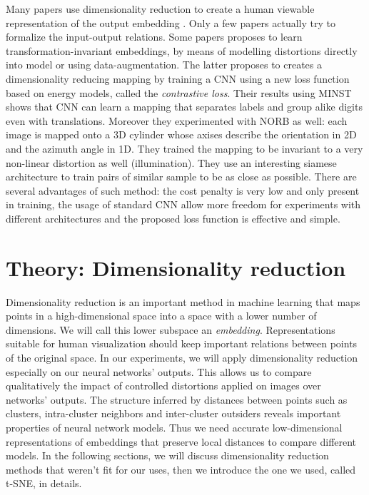 \documentclass[a4paper,12pt]{report}
\begin{document}
Many papers use dimensionality reduction to create a human viewable representation of the output embedding \cite{donahue2013decaf}\cite{yu2014visualizing}\cite{yaotiny}.
Only a few papers actually try to formalize the input-output relations\cite{goodfellow2009measuring}.
Some papers proposes to learn transformation-invariant embeddings, by means of modelling distortions directly into model\cite{gens2014deep} or using data-augmentation\cite{hadsell2006dimensionality}. %
The latter proposes to creates a dimensionality reducing mapping by training a CNN using a new loss function based on energy models, called the {\em contrastive loss}.
Their results using MINST shows that CNN can learn a mapping that separates labels and group alike digits even with translations.
Moreover they experimented with NORB as well: each image is mapped onto a 3D cylinder whose axises describe the orientation in 2D and the azimuth angle in 1D.
They trained the mapping to be invariant to a very non-linear distortion as well (illumination).
They use an interesting siamese architecture to train pairs of similar sample to be as close as possible.
There are several advantages of such method: the cost penalty is very low and only present in training, the usage of standard CNN allow more freedom for experiments with different architectures and the proposed loss function is effective and simple.


\chapter{Theory: Dimensionality reduction}
Dimensionality reduction is an important method in machine learning that maps points in a high-dimensional space into a space with a lower number of dimensions.
We will call this lower subspace an {\em embedding}.
Representations suitable for human visualization should keep important relations between points of the original space.
In our experiments, we will apply dimensionality reduction especially on our neural networks' outputs.
This allows us to compare qualitatively the impact of controlled distortions applied on images over networks' outputs.
The structure inferred by distances between points such as clusters, intra-cluster neighbors and inter-cluster outsiders reveals important properties of neural network models.
Thus we need accurate low-dimensional representations of embeddings that preserve local distances to compare different models.
In the following sections, we will discuss dimensionality reduction methods that weren't fit for our uses, then we introduce the one we used, called t-SNE, in details.
\end{document}
